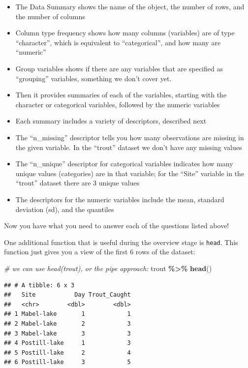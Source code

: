 \documentclass[
]{book}
\newenvironment{Shaded}{\begin{snugshade}}{\end{snugshade}}
\newcommand{\CommentTok}[1]{\textcolor[rgb]{0.56,0.35,0.01}{\textit{#1}}}
\newcommand{\FunctionTok}[1]{\textcolor[rgb]{0.13,0.29,0.53}{\textbf{#1}}}
\newcommand{\NormalTok}[1]{#1}
\newcommand{\SpecialCharTok}[1]{\textcolor[rgb]{0.81,0.36,0.00}{\textbf{#1}}}
\providecommand{\tightlist}{%
  \setlength{\itemsep}{0pt}\setlength{\parskip}{0pt}}
\begin{document}
\begin{itemize}
\tightlist
\item
  The Data Summary shows the name of the object, the number of rows, and the number of columns
\item
  Column type frequency shows how many columns (variables) are of type ``character'', which is equivalent to ``categorical'', and how many are ``numeric''
\item
  Group variables shows if there are any variables that are specified as ``grouping'' variables, something we don't cover yet.
\item
  Then it provides summaries of each of the variables, starting with the character or categorical variables, followed by the numeric variables
\item
  Each summary includes a variety of descriptors, described next
\item
  The ``n\_missing'' descriptor tells you how many observations are missing in the given variable. In the ``trout'' dataset we don't have any missing values
\item
  The ``n\_unique'' descriptor for categorical variables indicates how many unique values (categories) are in that variable; for the ``Site'' variable in the ``trout'' dataset there are 3 unique values
\item
  The descriptors for the numeric variables include the mean, standard deviation (sd), and the quantiles
\end{itemize}

Now you have what you need to answer each of the questions listed above!

One additional function that is useful during the overview stage is \texttt{head}. This function just gives you a view of the first 6 rows of the dataset:

\begin{Shaded}
\begin{Highlighting}[]
\CommentTok{\# we can use head(trout), or the pipe approach: }
\NormalTok{trout }\SpecialCharTok{\%\textgreater{}\%}
  \FunctionTok{head}\NormalTok{()}
\end{Highlighting}
\end{Shaded}

\begin{verbatim}
## # A tibble: 6 x 3
##   Site           Day Trout_Caught
##   <chr>        <dbl>        <dbl>
## 1 Mabel-lake       1            1
## 2 Mabel-lake       2            3
## 3 Mabel-lake       3            3
## 4 Postill-lake     1            3
## 5 Postill-lake     2            4
## 6 Postill-lake     3            5
\end{verbatim}
\end{document}
